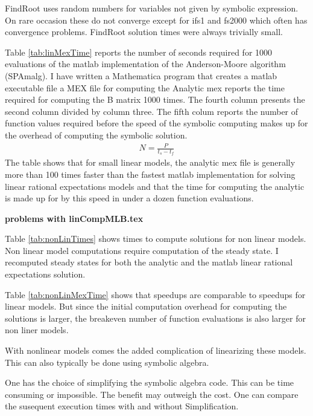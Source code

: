 \documentclass[12pt]{elsart}
\begin{document}
FindRoot uses random numbers for variables not given by symbolic expression.
On rare occasion these do not converge except for ifs1 and fs2000
 which often has convergence problems. 
FindRoot solution times were always trivially small.

%

Table \ref{tab:linMexTime} reports the number of seconds required for 1000 evaluations of
the matlab implementation of the Anderson-Moore algorithm (SPAmalg).
I have written a Mathematica program that creates a matlab executable file
a MEX file for computing the
Analytic mex reports the time required for computing the B matrix 1000 times.
The fourth column presents  the second column  divided by column three.
The fifth colum reports 
the number of function values required before the speed of the
symbolic computing makes up for the overhead of
computing the symbolic solution.
\begin{gather*}
  N=\frac{P}{t_s-t_f}
\end{gather*}
The table shows that for small linear models, 
the analytic mex file is generally more than 100 times
faster than the fastest matlab implementation for solving linear rational
expectations models and that the time for computing the analytic is
made up for by this speed in under a dozen function evaluations.


%
{\bf problems with {linCompMLB.tex}}

Table \ref{tab:nonLinTimes} shows times to compute solutions for non linear
models. Non linear model computations require computation of the steady state.
I recomputed steady states for both the analytic and the matlab linear 
rational expectations solution.





Table \ref{tab:nonLinMexTime} shows that
speedups are comparable to speedups for linear models. But since the 
initial computation overhead for computing the solutions is larger, the
breakeven number of function evaluations is also larger for non liner models.

    
With nonlinear models comes the added complication of linearizing these models.
This can also typically be done using symbolic algebra.

One has the choice of simplifying the symbolic algebra code. This can be
time consuming or impossible.  The benefit may outweigh the cost.
One can compare the susequent execution times with and without Simplification.
\end{document}
